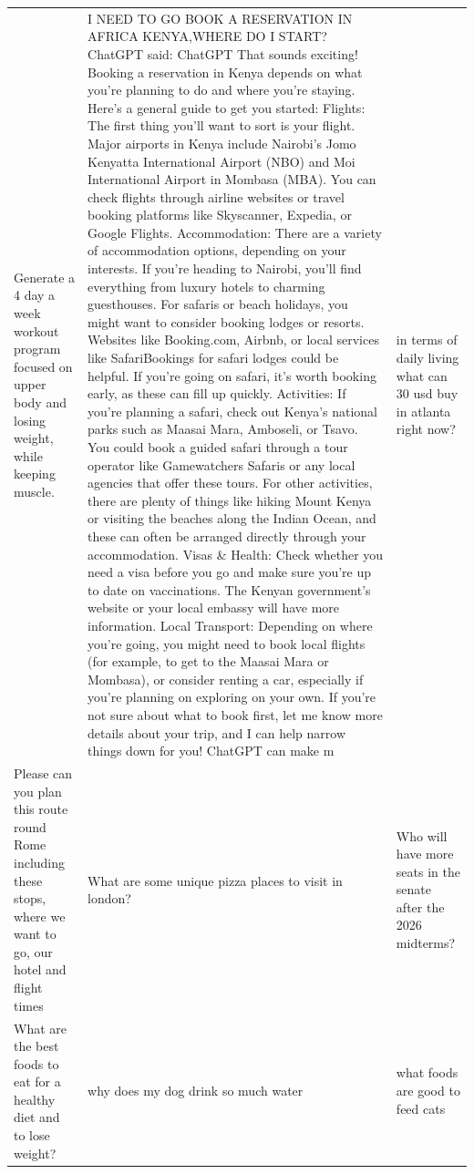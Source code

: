 \begin{table}[ht]
\begin{tabular}{p{4.3cm}p{4.3cm}p{4.3cm}}
Generate a 4 day a week workout program focused on upper body and losing weight, while keeping muscle. & I NEED TO GO BOOK A RESERVATION IN AFRICA KENYA,WHERE DO I START? ChatGPT said: ChatGPT That sounds exciting! Booking a reservation in Kenya depends on what you're planning to do and where you're staying. Here’s a general guide to get you started:  Flights: The first thing you’ll want to sort is your flight. Major airports in Kenya include Nairobi’s Jomo Kenyatta International Airport (NBO) and Moi International Airport in Mombasa (MBA). You can check flights through airline websites or travel booking platforms like Skyscanner, Expedia, or Google Flights.  Accommodation: There are a variety of accommodation options, depending on your interests. If you're heading to Nairobi, you’ll find everything from luxury hotels to charming guesthouses. For safaris or beach holidays, you might want to consider booking lodges or resorts. Websites like Booking.com, Airbnb, or local services like SafariBookings for safari lodges could be helpful. If you’re going on safari, it’s worth booking early, as these can fill up quickly.  Activities: If you're planning a safari, check out Kenya's national parks such as Maasai Mara, Amboseli, or Tsavo. You could book a guided safari through a tour operator like Gamewatchers Safaris or any local agencies that offer these tours. For other activities, there are plenty of things like hiking Mount Kenya or visiting the beaches along the Indian Ocean, and these can often be arranged directly through your accommodation.  Visas \& Health: Check whether you need a visa before you go and make sure you're up to date on vaccinations. The Kenyan government’s website or your local embassy will have more information.  Local Transport: Depending on where you’re going, you might need to book local flights (for example, to get to the Maasai Mara or Mombasa), or consider renting a car, especially if you're planning on exploring on your own.  If you’re not sure about what to book first, let me know more details about your trip, and I can help narrow things down for you!       ChatGPT can make m & in terms of daily living what can 30 usd buy in atlanta right now? \\[4pt]
Please can you plan this route round Rome including these stops, where we want to go, our hotel and flight times & What are some unique pizza places to visit in london? & Who will have more seats in the senate after the 2026 midterms? \\[4pt]
What are the best foods to eat for a healthy diet and to lose weight? & why does my dog drink so much water & what foods are good to feed cats \\[4pt]

\end{tabular}
\end{table}

